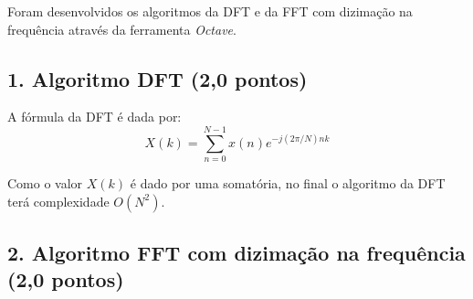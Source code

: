Foram desenvolvidos os algoritmos da DFT e da FFT com dizimação na frequência através da ferramenta \textit{Octave}.

\subsection*{1. Algoritmo DFT \textbf{(2,0 pontos)}}
A fórmula da DFT é dada por:
$$
X(k) = \sum_{n=0}^{N-1} x(n) e^{-j(2\pi/N)nk}
$$

Como o valor $X(k)$ é dado por uma somatória, no final o algoritmo da DFT terá complexidade $O(N^2)$.


\subsection*{2. Algoritmo FFT com dizimação na frequência \textbf{(2,0 pontos)}}

